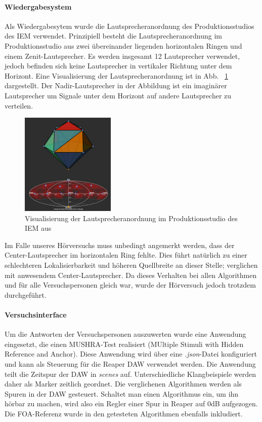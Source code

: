 \paragraph{Wiedergabesystem}
Als Wiedergabesytem wurde die Lautsprecheranordnung des Produktionsstudios des IEM verwendet. Prinzipiell besteht die Lautsprecheranordnung im Produktionsstudio aus zwei übereinander liegenden horizontalen Ringen und einem Zenit-Lautsprecher. Es werden insgesamt 12 Lautsprecher verwendet, jedoch befinden sich keine Lautsprecher in vertikaler Richtung unter dem Horizont. Eine Visualisierung der Lautsprecheranordnung ist in Abb. ~\ref{fig:aufb:prodstud} dargestellt. Der Nadir-Lautsprecher in der Abbildung ist ein imaginärer Lautsprecher um Signale unter dem Horizont auf andere Lautsprecher zu verteilen.

\begin{figure}[!ht]
  \centering
  \includegraphics[width=0.4\textwidth]{aufbau/plots/speaker_pos_prod_studio.png}
  \caption{Visualisierung der Lautsprecheranordnung im Produktionsstudio des IEM aus \cite{ambi-book}}
  \label{fig:aufb:prodstud}
\end{figure}



Im Falle unseres Hörversuchs muss unbedingt angemerkt werden, dass der Center-Lautsprecher im horizontalen Ring fehlte. Dies führt natürlich zu einer schlechteren Lokalisierbarkeit und höheren Quellbreite an dieser Stelle; verglichen mit anwesendem Center-Lautsprecher. Da dieses Verhalten bei allen Algorithmen und für alle Versuchspersonen gleich war, wurde der Hörversuch jedoch trotzdem durchgeführt.

\paragraph{Versuchsinterface}
Um die Antworten der Versuchspersonen auszuwerten wurde eine Anwendung eingesetzt, die einen MUSHRA-Test realisiert (MUltiple Stimuli with Hidden Reference and Anchor). Diese Anwendung wird über eine \textit{.json}-Datei konfiguriert und kann als Steuerung für die Reaper DAW verwendet werden. Die Anwendung teilt die Zeitspur der DAW in \textit{scenes} auf. Unterschiedliche Klangbeispiele werden daher als Marker zeitlich geordnet. Die verglichenen Algorithmen werden als Spuren in der DAW gesteuert. Schaltet man einen Algorithmus ein, um ihn hörbar zu machen, wird also ein Regler einer Spur in Reaper auf 0dB aufgezogen. Die FOA-Referenz wurde in den getesteten Algorithmen ebenfalls inkludiert.

